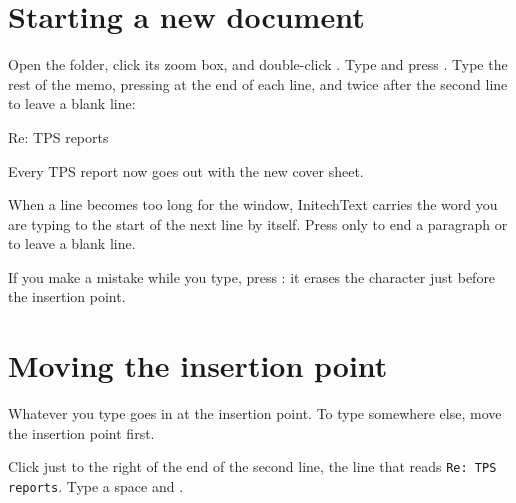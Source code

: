 \section{Starting a new document}
\begin{TaskSteps}
\Step Open the  folder, click its zoom box, and double-click
.
\Step Type  and press .
\Step Type the rest of the memo, pressing  at the end of each
line, and twice after the second line to leave a blank line:
\begin{TypeIn}
Re: TPS reports

Every TPS report now goes out with
the new cover sheet.
\end{TypeIn}
\end{TaskSteps}


When a line becomes too long for the window, InitechText carries the word
you are typing to the start of the next line by itself.  Press 
only to end a paragraph or to leave a blank line.

If you make a mistake while you type, press : it erases the
character just before the insertion point.

\section{Moving the insertion point}
Whatever you type goes in at the insertion point.  To type somewhere else,
move the insertion point first.
\begin{TaskSteps}
\Step Click just to the right of the end of the second line, the line that
reads \texttt{Re: TPS reports}.
\Step Type a space and .
\end{TaskSteps}

